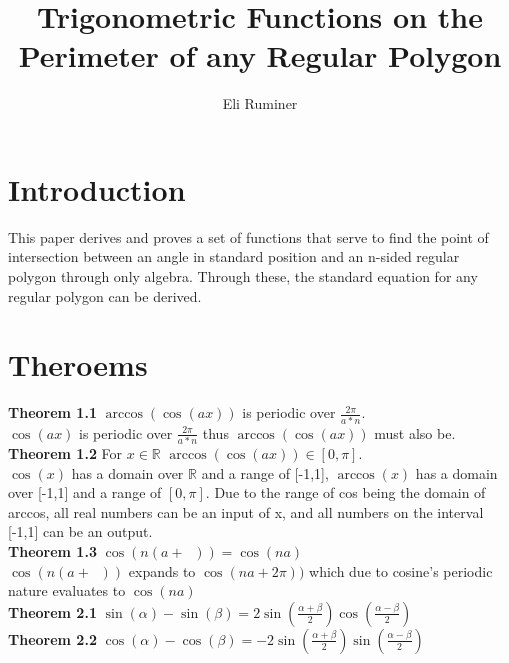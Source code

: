 \documentclass[11pt]{article}
\title{Trigonometric Functions on the Perimeter of any Regular Polygon}
\author{Eli Ruminer}
\date{}
\DeclareMathOperator{\period}{\frac{2\pi}{n}}
\begin{document}
\begin{titlepage}
\clearpage\maketitle
\thispagestyle{empty}
\end{titlepage}

\tableofcontents
\newpage

\section{Introduction}
This paper derives and proves a set of functions that serve to find the point of intersection between an angle in standard position and an n-sided regular polygon through only algebra. Through these, the standard equation for any regular polygon can be derived.


\section{Theroems}
\textbf{Theorem 1.1} \(\arccos(\cos(ax))\) is periodic over \(\frac{2\pi}{a*n}\).\\
\(\cos(ax)\) is periodic over \(\frac{2\pi}{a*n}\) thus \(\arccos(\cos(ax))\) must also be.\\
\textbf{Theorem 1.2} For \(x\in\mathbb{R}\) \(\arccos(\cos(ax))\in[0,\pi]\).\\
\(\cos(x)\) has a domain over \(\mathbb{R}\) and a range of [-1,1], \(\arccos(x)\) has a domain over [-1,1] and a range of \([0,\pi]\). Due to the range of cos being the domain of arccos, all real numbers can be an input of x, and all numbers on the interval [-1,1] can be an output.\\
\textbf{Theorem 1.3} \(\cos(n(a+\period))=\cos(na)\)\\
\(\cos(n(a+\period))\) expands to \(\cos(na+2\pi))\) which due to cosine's periodic nature evaluates to \(\cos(na)\)\\
\textbf{Theorem 2.1} \(\sin(\alpha)-\sin(\beta)=2\sin(\frac{\alpha+\beta}{2})\cos(\frac{\alpha-\beta}{2})\)\\
\textbf{Theorem 2.2} \(\cos(\alpha)-\cos(\beta)=-2\sin(\frac{\alpha+\beta}{2})\sin(\frac{\alpha-\beta}{2})\)
\end{document}
